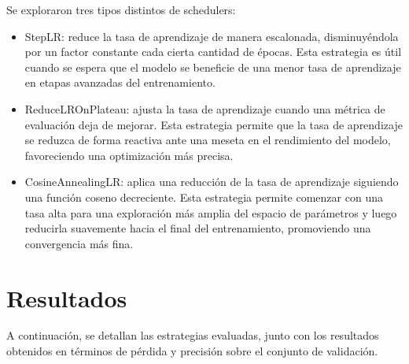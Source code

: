 Se exploraron tres tipos distintos de schedulers:

\begin{itemize}
	\item StepLR: reduce la tasa de aprendizaje de manera escalonada, disminuyéndola por un factor constante cada cierta cantidad de épocas. Esta estrategia es útil cuando se espera que el modelo se beneficie de una menor tasa de aprendizaje en etapas avanzadas del entrenamiento.
	\item ReduceLROnPlateau: ajusta la tasa de aprendizaje cuando una métrica de evaluación deja de mejorar. Esta estrategia permite que la tasa de aprendizaje se reduzca de forma reactiva ante una meseta en el rendimiento del modelo, favoreciendo una optimización más precisa.
	\item CosineAnnealingLR: aplica una reducción de la tasa de aprendizaje siguiendo una función coseno decreciente. Esta estrategia permite comenzar con una tasa alta para una exploración más amplia del espacio de parámetros y luego reducirla suavemente hacia el final del entrenamiento, promoviendo una convergencia más fina.
\end{itemize}

\section{Resultados}
A continuación, se detallan las estrategias evaluadas, junto con los resultados obtenidos en términos de pérdida y precisión sobre el conjunto de validación.


